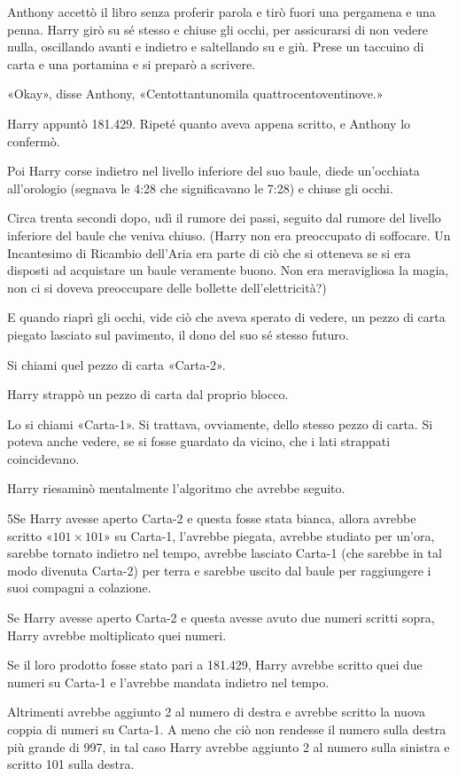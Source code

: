 Anthony accettò il libro senza proferir parola e tirò fuori una pergamena e una penna. Harry girò su sé stesso e chiuse gli occhi, per assicurarsi di non vedere nulla, oscillando avanti e indietro e saltellando su e giù. Prese un taccuino di carta e una portamina e si preparò a scrivere.

«Okay», disse Anthony, «Centottantunomila quattrocentoventinove.»

Harry appuntò 181.429. Ripeté quanto aveva appena scritto, e Anthony lo confermò.

Poi Harry corse indietro nel livello inferiore del suo baule, diede un’occhiata all’orologio (segnava le 4:28 che significavano le 7:28) e chiuse gli occhi.

Circa trenta secondi dopo, udì il rumore dei passi, seguito dal rumore del livello inferiore del baule che veniva chiuso. (Harry non era preoccupato di soffocare. Un Incantesimo di Ricambio dell’Aria era parte di ciò che si otteneva se si era disposti ad acquistare un baule veramente buono. Non era meravigliosa la magia, non ci si doveva preoccupare delle bollette dell’elettricità?)

E quando riaprì gli occhi, vide ciò che aveva sperato di vedere, un pezzo di carta piegato lasciato sul pavimento, il dono del suo sé stesso futuro.

Si chiami quel pezzo di carta «Carta-2».

Harry strappò un pezzo di carta dal proprio blocco.

Lo si chiami «Carta-1». Si trattava, ovviamente, dello stesso pezzo di carta. Si poteva anche vedere, se si fosse guardato da vicino, che i lati strappati coincidevano.

Harry riesaminò mentalmente l’algoritmo che avrebbe seguito.

5Se Harry avesse aperto Carta-2  e questa fosse stata bianca, allora avrebbe scritto «$101 \times 101$» su Carta-1, l’avrebbe piegata, avrebbe studiato per un’ora, sarebbe tornato indietro nel tempo, avrebbe lasciato Carta-1 (che sarebbe in tal modo divenuta Carta-2) per terra e sarebbe uscito dal baule per raggiungere i suoi compagni a colazione.

Se Harry avesse aperto Carta-2 e questa avesse avuto due numeri scritti sopra, Harry avrebbe moltiplicato quei numeri.

Se il loro prodotto fosse stato pari a 181.429, Harry avrebbe scritto quei due numeri su Carta-1 e l’avrebbe mandata indietro nel tempo.

Altrimenti avrebbe aggiunto 2 al numero di destra e avrebbe scritto la nuova coppia di numeri su Carta-1. A meno che ciò non rendesse il numero sulla destra più grande di 997, in tal caso Harry avrebbe aggiunto 2 al numero sulla sinistra e scritto 101 sulla destra.

